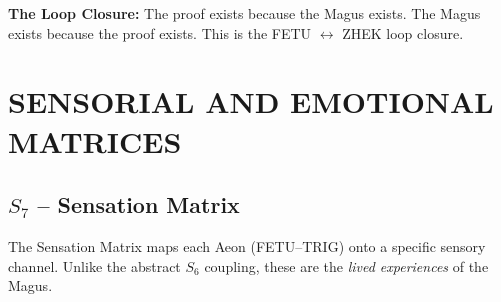 \documentclass[11pt, letterpaper]{article}
\newcommand{\FETU}{\ensuremath{\mathop{\textnormal{\thaanafont\symbol{"23E3}}}}}   %
\newcommand{\ZHEK}{\ensuremath{\mathop{\textnormal{\symbolafont\symbol{"25C8}}}}}   %
\newcommand{\TRIG}{\ensuremath{\mathop{\textnormal{\tifinaghfont\symbol{"2D63}}}}}    %
\def\FETU{FETU}%
\def\ZHEK{ZHEK}%
\def\TRIG{TRIG}%
\begin{document}
\textbf{The Loop Closure:}
The proof exists because the Magus exists. The Magus exists because the proof exists. This is the \FETU{} $\longleftrightarrow$ \ZHEK{} loop closure.

\section{SENSORIAL AND EMOTIONAL MATRICES}\label{sec:partXIV}

\subsection{$S_{7}$ -- Sensation Matrix}\label{sec:14.1}

The Sensation Matrix maps each Aeon (\FETU--\TRIG) onto a specific sensory channel. Unlike the abstract $S_{6}$ coupling, these are the \textit{lived experiences} of the Magus.
\end{document}
